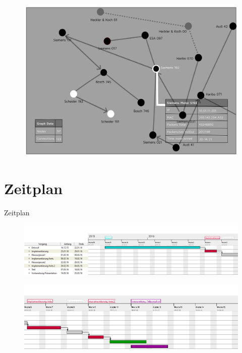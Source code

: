 \documentclass[18pt]{beamer}
\begin{document}
\begin{frame}
	\begin{figure}
		\includegraphics[height=0.95\textheight]{./images/GUI.png}
	\end{figure}
\end{frame}

\section{Zeitplan}
\begin{frame}{Zeitplan}
    \begin{figure}
      \centering
      \includegraphics[width=\textwidth]{./images/timeline1.png}
    \end{figure}
    
    \begin{figure}
      \centering
      \includegraphics[width=\textwidth]{./images/timeline2.png}
    \end{figure}
\end{frame}

\appendix
\beginbackup


\backupend
\end{document}
